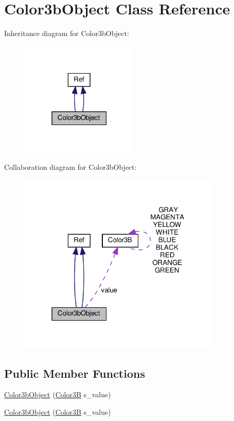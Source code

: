 \hypertarget{classColor3bObject}{}\section{Color3b\+Object Class Reference}
\label{classColor3bObject}


Inheritance diagram for Color3b\+Object\+:
\nopagebreak
\begin{figure}[H]
\begin{center}
\leavevmode
\includegraphics[width=159pt]{classColor3bObject__inherit__graph}
\end{center}
\end{figure}


Collaboration diagram for Color3b\+Object\+:
\nopagebreak
\begin{figure}[H]
\begin{center}
\leavevmode
\includegraphics[width=274pt]{classColor3bObject__coll__graph}
\end{center}
\end{figure}
\subsection*{Public Member Functions}
\begin{DoxyCompactItemize}
\item 
\hyperlink{classColor3bObject_ac73a9196d675b8a4173142ee22d5208d}{Color3b\+Object} (\hyperlink{structColor3B}{Color3B} s\+\_\+value)
\item 
\hyperlink{classColor3bObject_ac73a9196d675b8a4173142ee22d5208d}{Color3b\+Object} (\hyperlink{structColor3B}{Color3B} s\+\_\+value)
\end{DoxyCompactItemize}
